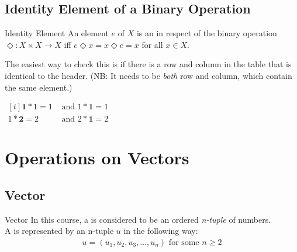 \documentclass[../notes.tex]{subfiles}
\begin{document}
			\subsection{Identity Element of a Binary Operation}
				\begin{definition}{Identity Element}
					An element $e$ of $X$ is an  in respect of the binary operation $\Diamond: X \times X \rightarrow X$ iff $e \Diamond x = x \Diamond e = x$ for all $x \in X$.
				\end{definition}
				The easiest way to check this is if there is a row and column in the table that is identical to the header. (NB: It needs to be \emph{both} row and column, which contain the same element.)
				\begin{example}[hbox] $
					\begin{aligned}[t]
						\mathbf{1} * 1 = 1 &\text{ and } 1 * \mathbf{1} = 1\\
						1 * \mathbf{2} = 2 &\text{ and } 2 * \mathbf{1} = 2
					\end{aligned} $
				\end{example}
		\section{Operations on Vectors}
			\subsection{Vector}
				\begin{definition}{Vector}
					In this course, a  is considered to be an ordered \emph{n-tuple} of numbers.\\
					A  is represented by an n-tuple $u$ in the following way:
					\begin{align*}
						u = (u_{1}, u_{2}, u_{3}, \ldots, u_{n}) \text{ for some } n \geq 2
					\end{align*}
				\end{definition}
\end{document}
